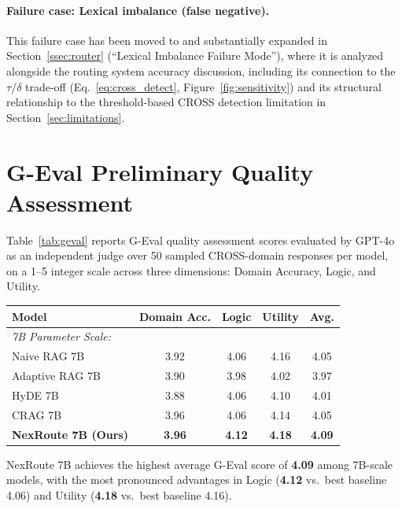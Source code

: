 \documentclass[a4paper,fleql]{cas-sc}
\begin{document}
\paragraph{Failure case: Lexical imbalance (false negative).}
This failure case has been moved to and substantially expanded in
Section~\ref{ssec:router} (``Lexical Imbalance Failure Mode''), where it is
analyzed alongside the routing system accuracy discussion, including its
connection to the $\tau$/$\delta$ trade-off (Eq.~\ref{eq:cross_detect},
Figure~\ref{fig:sensitivity}) and its structural relationship to the
threshold-based CROSS detection limitation in Section~\ref{sec:limitations}.

\section{G-Eval Preliminary Quality Assessment}
\label{appendix:geval}

Table~\ref{tab:geval} reports G-Eval quality assessment scores evaluated by
GPT-4o as an independent judge over 50 sampled CROSS-domain responses per
model, on a 1--5 integer scale across three dimensions: Domain Accuracy,
Logic, and Utility.

\vspace{6pt}
\begin{center}
\begingroup
{}
\label{tab:geval}
\begin{tabular}{lcccc}
\toprule
\textbf{Model} & \textbf{Domain Acc.} & \textbf{Logic} & \textbf{Utility} & \textbf{Avg.} \\
\midrule
\multicolumn{5}{l}{\textit{7B Parameter Scale:}} \\
Naive RAG 7B                & 3.92 & 4.06 & 4.16 & 4.05 \\
Adaptive RAG 7B             & 3.90 & 3.98 & 4.02 & 3.97 \\
HyDE 7B                     & 3.88 & 4.06 & 4.10 & 4.01 \\
CRAG 7B                     & 3.96 & 4.06 & 4.14 & 4.05 \\
\textbf{NexRoute 7B (Ours)} & \textbf{3.96} & \textbf{4.12} & \textbf{4.18} & \textbf{4.09} \\
\bottomrule
\end{tabular}
\endgroup
\end{center}
\vspace{6pt}

NexRoute 7B achieves the highest average G-Eval score of \textbf{4.09} among
7B-scale models, with the most pronounced advantages in Logic (\textbf{4.12}
vs.\ best baseline 4.06) and Utility (\textbf{4.18} vs.\ best baseline 4.16).
\end{document}
